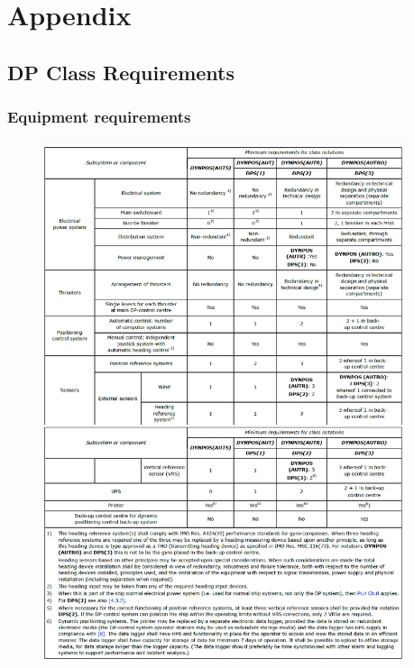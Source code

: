 \section*{Appendix}\label{Appendix}
\appendix
\renewcommand{\thesubsection}{\Alph{subsection}}

\subsection{DP Class Requirements}\label{Sec:DP_Class_Requirements} 

\subsubsection{Equipment requirements}\label{Sec:Equipment_Requirements}
\begin{figure}[h]
    \centering
    \includegraphics[width = 0.95\textwidth, height = 0.73\textheight]{figures/DP_requirements_table.eps}
\end{figure}

